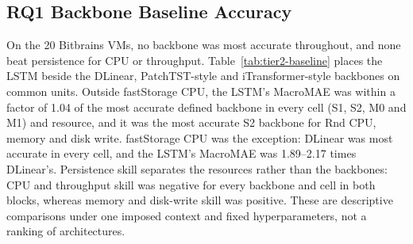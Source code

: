\documentclass[5p,twocolumn]{elsarticle}
\begin{document}
\subsection{RQ1 Backbone Baseline Accuracy}
\label{sec:results-baselines}

On the 20 Bitbrains VMs, no backbone was most accurate throughout, and none
beat persistence for CPU or throughput. Table~\ref{tab:tier2-baseline} places the LSTM beside the
DLinear, PatchTST-style and iTransformer-style backbones on common units. Outside
fastStorage CPU, the LSTM's MacroMAE was within a factor of 1.04 of the most
accurate defined backbone in every cell (S1, S2, M0 and M1) and resource, and
it was the most accurate S2 backbone for Rnd CPU, memory and disk write.
fastStorage CPU was the exception: DLinear was most accurate in every cell,
and the LSTM's MacroMAE was 1.89--2.17 times DLinear's. Persistence skill separates the resources rather than
the backbones: CPU and throughput skill was negative for every backbone and
cell in both blocks, whereas memory and disk-write skill was positive. These
are descriptive comparisons under one imposed context and fixed
hyperparameters, not a ranking of architectures.
\end{document}
